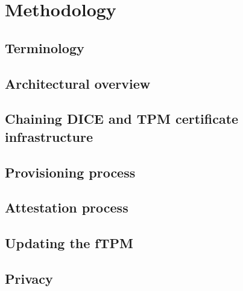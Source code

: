 
\chapter{Methodology}\label{chapter:methodology}

\section{Terminology}


\section{Architectural overview}



\section{Chaining DICE and TPM certificate infrastructure}

\section{Provisioning process}


\section{Attestation process}


\section{Updating the fTPM}


\section{Privacy}

